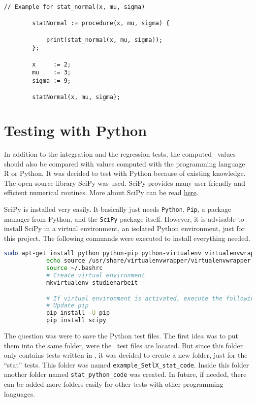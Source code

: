 	\begin{center}
		\begin{lstlisting}[caption={Test File Example}, language={setlx}, label={lis:exampleCode}]
		// Example for stat_normal(x, mu, sigma)

		statNormal := procedure(x, mu, sigma) {

			print(stat_normal(x, mu, sigma));
		};

		x     := 2;
		mu	  := 3;
		sigma := 9;

		statNormal(x, mu, sigma);
		\end{lstlisting}
	\end{center}


\section{Testing with Python}

	In addition to the integration and the regression tests, the computed \setlx\ values should also be compared with values computed with the programming language R or Python. It was decided to test with Python because of existing knowledge. The open-source library \ac{SciPy} was used. \ac{SciPy} provides many user-friendly and efficient numerical routines. More about \ac{SciPy} can be read \href{https://www.scipy.org/}{here}.

	\ac{SciPy} is installed very easily. It basically just needs \lstinline{Python}, \lstinline{Pip}, a package manager from Python, and the \lstinline{SciPy} package itself. However, it is advisable to install \ac{SciPy} in a virtual environment, an isolated Python environment, just for this project. The following commands were executed to install everything needed.

	\begin{center}
		\begin{lstlisting}[caption={Install Virtual Environment and SciPy}, language={bash}, label={lis:scipy}]
			sudo apt-get install python python-pip python-virtualenv virtualenvwrapper
			echo source /usr/share/virtualenvwrapper/virtualenvwrapper.sh >> ~/.bashrc
			source ~/.bashrc
			# Create virtual environment
			mkvirtualenv studienarbeit

			# If virtual environment is activated, execute the following:
			# Update pip
			pip install -U pip
			pip install scipy
		\end{lstlisting}
	\end{center}

	The question was were to save the Python test files. The first idea was to put them into the same folder, were the \setlx\ test files are located. But since this folder only contains tests written in \setlx, it was decided to create a new folder, just for the \enquote{stat} tests. This folder was named \lstinline{example_SetlX_stat_code}. Inside this folder another folder named \lstinline{stat_python_code} was created. In future, if needed, there can be added more folders easily for other tests with other programming languages.

